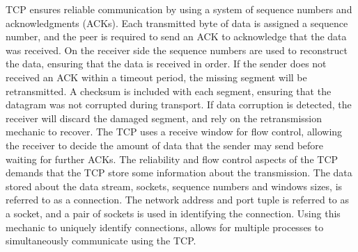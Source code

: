 \documentclass[english, 12pt, a4paper, elec, utf8, a-2b, online]{aaltothesis}
\begin{document}
TCP ensures reliable communication by using a system of sequence numbers and
acknowledgments (ACKs). Each transmitted byte of data is assigned a sequence
number, and the peer is required to send an ACK to acknowledge that the data was
received. On the receiver side the sequence numbers are used to reconstruct the
data, ensuring that the data is received in order. If the sender does not received
an ACK within a timeout period, the missing segment will be retransmitted. A
checksum is included with each segment, ensuring that the datagram was not
corrupted during transport. If data corruption is detected, the receiver will
discard the damaged segment, and rely on the retransmission mechanic to recover.
The TCP uses a receive window for flow control, allowing the receiver to decide 
the amount of data that the sender may send before waiting for further ACKs. The
reliability and flow control aspects of the TCP demands that the TCP store some
information about the transmission. The data stored about the data stream, sockets,
sequence numbers and windows sizes, is referred to as a connection. The network
address and port tuple is referred to as a socket, and a pair of sockets is used
in identifying the connection. Using this mechanic to uniquely identify connections,
allows for multiple processes to simultaneously communicate using the TCP\cite{rfc793}.
\end{document}
